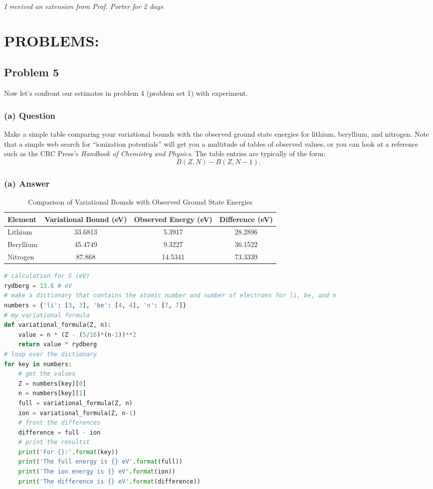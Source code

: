 \documentclass{article}
\begin{document}
\emph{I received an extension from Prof. Porter for 2 days}
\section*{PROBLEMS:}

\subsection*{Problem 5}
Now let's confront our estimates in problem 4 (problem set 1) with experiment.

\subsubsection*{(a) Question}
Make a simple table comparing your variational bounds with the observed ground state energies for lithium, beryllium, and nitrogen. Note that a simple web search for ``ionization potentials'' will get you a multitude of tables of observed values, or you can look at a reference such as the CRC Press's \textit{Handbook of Chemistry and Physics}. The table entries are typically of the form:
\begin{equation*}
    B(Z, N) - B(Z, N - 1).
\end{equation*}

\subsubsection*{(a) Answer}
\begin{table}[h!]
\centering
\begin{tabular}{lccc}
\toprule
Element & Variational Bound (eV) & Observed Energy (eV) & Difference (eV) \\
\midrule
Lithium    & 33.6813 & 5.3917 & 28.2896 \\
Beryllium  & 45.4749 & 9.3227 & 36.1522 \\
Nitrogen   & 87.868 & 14.5341 & 73.3339 \\
\bottomrule
\end{tabular}
\caption{Comparison of Variational Bounds with Observed Ground State Energies}
\label{tab:comparison}
\end{table}

\begin{lstlisting}[language=Python]
# calculation for 5 (eV)
rydberg = 13.6 # eV
# make a dictionary that contains the atomic number and number of electrons for li, be, and n
numbers = {'li': [3, 3], 'be': [4, 4], 'n': [7, 7]}
# my variational formula
def variational_formula(Z, n):
    value = n * (Z - (5/16)*(n-1))**2
    return value * rydberg
# loop over the dictionary
for key in numbers:
    # get the values
    Z = numbers[key][0]
    n = numbers[key][1]
    full = variational_formula(Z, n)
    ion = variational_formula(Z, n-1)
    # front the differences
    difference = full - ion
    # print the resultst
    print('For {}:'.format(key))
    print('The full energy is {} eV'.format(full))
    print('The ion energy is {} eV'.format(ion))
    print('The difference is {} eV'.format(difference))
\end{lstlisting}
\end{document}
